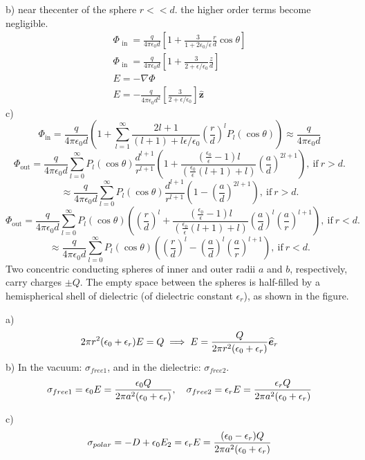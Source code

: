 \documentclass[UTF8,9pt]{ctexart}
\begin{document}
b) near thecenter of the sphere $r<<d$.  the higher order terms become negligible.
$$ 
\begin{array}{l}
{\Phi_{\text { in }}=\frac{q}{4 \pi \epsilon_{0} d}[1+\frac{3}{1+2 \epsilon_{0} / \epsilon} \frac{r}{d} \cos \theta]} \\ {\Phi_{\text { in }}=\frac{q}{4 \pi \epsilon_{0} d}[1+\frac{3}{2+\epsilon / \epsilon_{0}} \frac{z}{d}]} \\ 
{E=-\nabla \Phi} \\ 
{E=-\frac{q}{4 \pi \epsilon_{0} d^{2}}[\frac{3}{2+\epsilon / \epsilon_{0}}] \hat{\mathbf{z}}}\end{array}
 $$
c) 
$$ 
\Phi_{\mathrm{in}}=\frac{q}{4 \pi \epsilon_{0} d}(1+\sum_{l=1}^{\infty} \frac{2 l+1}{(l+1)+l \epsilon / \epsilon_{0}}(\frac{r}{d})^{l} P_{l}(\cos \theta)) \approx \frac{q}{4 \pi \epsilon_{0} d}
 $$
 $$ 
\Phi_{\mathrm{out}}=\frac{q}{4 \pi \epsilon_{0} d} \sum_{l=0}^{\infty} P_{l}(\cos \theta) \frac{d^{l+1}}{r^{l+1}}(1+\frac{(\frac{\epsilon_{0}}{\epsilon}-1) l}{(\frac{\epsilon_{0}}{\epsilon}(l+1)+l)}(\frac{a}{d})^{2 l+1}),\ \text{if}\ r>d.
 $$
 $$ 
 \approx \frac{q}{4 \pi \epsilon_{0} d} \sum_{l=0}^{\infty} P_{l}(\cos \theta) \frac{d^{l+1}}{r^{l+1}}(1-(\frac{a}{d})^{2 l+1}),\ \text{if}\ r>d.
$$
$$ 
\Phi_{\mathrm{out}}=\frac{q}{4 \pi \epsilon_{0} d} \sum_{l=0}^{\infty} P_{l}(\cos \theta)((\frac{r}{d})^{l}+\frac{(\frac{\epsilon_{0}}{\epsilon}-1) l}{(\frac{\epsilon_{0}}{\epsilon}(l+1)+l)}(\frac{a}{d})^{l}(\frac{a}{r})^{l+1}),\ \text{if}\ r<d.
 $$
 $$ 
\approx \frac{q}{4 \pi \epsilon_{0} d} \sum_{l=0}^{\infty} P_{l}(\cos \theta)((\frac{r}{d})^{l} - (\frac{a}{d})^{l}(\frac{a}{r})^{l+1}),\ \text{if}\ r<d.
 $$
Two concentric conducting spheres of inner and outer radii $a$ and $b$, respectively, carry charges $\pm Q$. The empty space between the spheres is half-filled by a hemispherical shell of dielectric (of dielectric constant $\epsilon_r$), as shown in the figure.

a)
$$2\pi r^2 (\epsilon_0+\epsilon_r)E=Q \implies E = \frac{Q}{2\pi r^2 (\epsilon_0+\epsilon_r)}\widehat{\bm{e}}_r$$
b) In the vacuum: $\sigma_{free1}$, and in the dielectric: $\sigma_{free2}$.
$$\sigma_{free1} = \epsilon_0 E=\frac{\epsilon_0 Q}{2\pi a^2 (\epsilon_0+\epsilon_r)}, \quad \sigma_{free2} = \epsilon_r E=\frac{\epsilon_r Q}{2\pi a^2 (\epsilon_0+\epsilon_r)}$$

c)
$$\sigma_{polar}=-D+\epsilon_0E_2=\epsilon_r E=\frac{(\epsilon_0-\epsilon_r) Q}{2\pi a^2 (\epsilon_0+\epsilon_r)}$$
\end{document}
